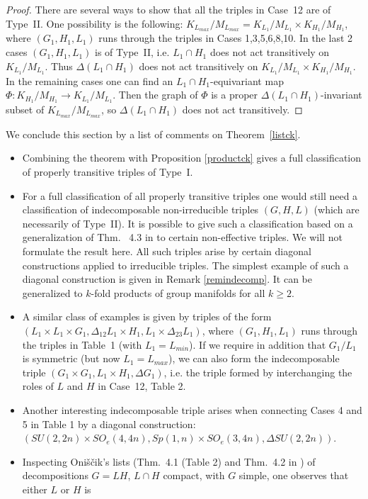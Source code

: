 \documentclass[10]{amsart}
\theoremstyle{remark}
\theoremstyle{definition}
\numberwithin{equation}{section}
\begin{document}
{\begin{proof}
There are several ways to show that all the triples in Case~12 are of Type~II.
One possibility is the following: $K_{L_{max}}/M_{L_{max}}=K_{L_1}/M_{L_1}\times K_{H_1}/M_{H_1}$, where $(G_1, H_1,L_1)$ runs through the triples in Cases 1,3,5,6,8,10.
In the last 2 cases $(G_1, H_1,L_1)$ is of Type~II, i.e. $L_1\cap H_1$ does not act transitively on $K_{L_1}/M_{L_1}$. Thus $\Delta(L_1\cap H_1)$ does not act transitively on 
$K_{L_1}/M_{L_1}\times K_{H_1}/M_{H_1}$. In the remaining cases one can find an $L_1\cap H_1$-equivariant map $\Phi: K_{H_1}/M_{H_1}\rightarrow K_{L_1}/M_{L_1}$.
Then the graph of $\Phi$ is a proper $\Delta(L_1\cap H_1)$-invariant subset of $K_{L_{max}}/M_{L_{max}}$, so $\Delta(L_1\cap H_1)$ does not act transitively.
\end{proof}
%
We conclude this section by a list of comments on Theorem~\ref{listck}.
\begin{itemize}
\item Combining the theorem with Proposition \ref{productck} gives a full classification of properly transitive triples of Type~I.
\item For a full classification of all properly transitive triples one would still need a classification of indecomposable non-irreducible triples $(G,H,L)$ (which are necessarily of Type~II).
It is possible to give such a classification based on a generalization of Thm.~ 4.3 in \cite{Oni69}
to certain non-effective triples. We will not formulate the result here.
All such triples arise by certain diagonal constructions applied to irreducible triples. The simplest example of such a diagonal construction is given in Remark \ref{remindecomp}. It can be generalized to $k$-fold
products of group manifolds for all $k\ge 2$. 
\item A similar class of examples is given by triples of the form $(L_1\times L_1\times G_1, \Delta_{12}L_1\times H_1, L_1\times \Delta_{23} L_1)$,
where $(G_1, H_1, L_1)$ runs through the triples in Table~1 (with $L_1=L_{min}$). If we require in addition that $G_1/L_1$ is symmetric (but now $L_1=L_{max}$), we can also form the indecomposable triple
$(G_1\times G_1, L_1\times H_1, \Delta G_1)$, i.e. the triple formed by interchanging the roles of $L$ and $H$ in Case~12, Table 2.
\item Another interesting indecomposable triple arises when connecting Cases 4 and 5 in Table 1 by a diagonal construction: $(SU(2,2n)\times SO_e(4,4n), Sp(1,n)\times SO_e(3,4n),\Delta SU(2,2n))$.
\item Inspecting Oni\v s\v cik's  lists (Thm.~4.1 (Table 2) and  Thm.~4.2 in  \cite{Oni69}) of decompositions $G=LH$, $L\cap H$ compact, with $G$ simple, one observes that either $L$ or $H$ is

\end{itemize}}
\end{document}
